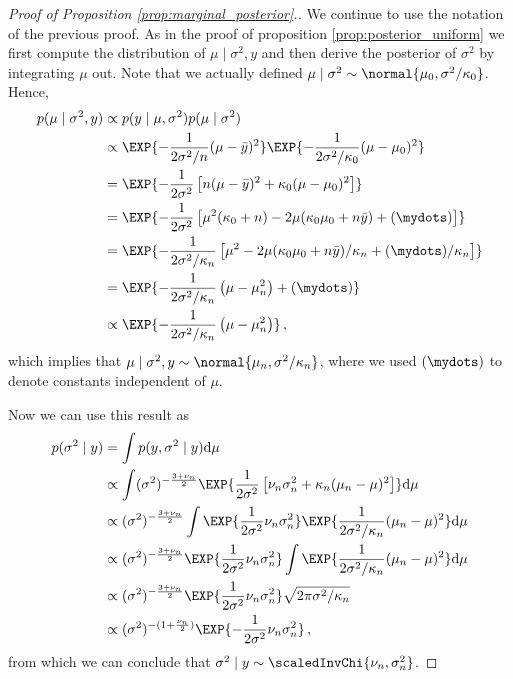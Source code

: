 \begin{proof}[Proof of Proposition \ref{prop:marginal_posterior}.]
We continue to use the notation of the previous proof.
As in the proof of proposition \ref{prop:posterior_uniform} we first compute the distribution of $\mu \mid \sigma^2, y$ and then derive the posterior of $\sigma^2$ by integrating $\mu$ out.
Note that we actually defined $\mu \mid \sigma^2 \sim \normal{\mu_0, \sigma^2/\kappa_0}$.
Hence,
\begin{align*}
  p(\mu \mid \sigma^2, y) &\propto p(y \mid \mu, \sigma^2) p(\mu \mid \sigma^2)\\
  &\propto \EXP{-\frac{1}{2\sigma^2/n} (\mu - \bar{y})^2} \EXP{-\frac{1}{2\sigma^2/\kappa_0}(\mu - \mu_0)^2}\\
  &= \EXP{-\frac{1}{2\sigma^2}\left[n(\mu - \bar{y})^2 + \kappa_0(\mu - \mu_0)^2 \right]}\\
  &= \EXP{-\frac{1}{2\sigma^2}\left[\mu^2(\kappa_0 + n) - 2\mu(\kappa_0\mu_0 + n\bar{y}) + (\mydots) \right]}\\
  &= \EXP{-\frac{1}{2\sigma^2 / \kappa_n}\left[\mu^2 - 2\mu(\kappa_0\mu_0 + n\bar{y})/\kappa_n + (\mydots)/\kappa_n \right]}\\
  &= \EXP{-\frac{1}{2\sigma^2 / \kappa_n}\left(\mu - \mu_n^2\right) + (\mydots)}\\
  &\propto \EXP{-\frac{1}{2\sigma^2 / \kappa_n}\left(\mu - \mu_n^2\right)} \,,
\end{align*}
which implies that $\mu \mid \sigma^2, y \sim \normal{\mu_n, \sigma^2 / \kappa_n}$, where we used $(\mydots)$ to denote constants independent of $\mu$.

Now we can use this result as
\begin{align*}
  p(\sigma^2 \mid y) &= \int p(y, \sigma^2 \mid y) \mathrm{d}\mu\\
  &\propto \int (\sigma^2)^{-\frac{3 + \nu_n}{2}} \EXP{\frac{1}{2\sigma^2} \left[\nu_n \sigma_n^2 + \kappa_n(\mu_n - \mu)^2 \right]}\mathrm{d}\mu\\
  &\propto (\sigma^2)^{-\frac{3 + \nu_n}{2}} \int \EXP{\frac{1}{2\sigma^2} \nu_n \sigma_n^2}\EXP{\frac{1}{2\sigma^2 / \kappa_n} (\mu_n - \mu)^2 }\mathrm{d}\mu\\
  &\propto (\sigma^2)^{-\frac{3 + \nu_n}{2}}\EXP{\frac{1}{2\sigma^2} \nu_n \sigma_n^2} \int \EXP{\frac{1}{2\sigma^2 / \kappa_n} (\mu_n - \mu)^2 }\mathrm{d}\mu\\
  &\propto (\sigma^2)^{-\frac{3 + \nu_n}{2}}\EXP{\frac{1}{2\sigma^2} \nu_n \sigma_n^2} \sqrt{2 \pi \sigma^2 / \kappa_n}\\
  &\propto (\sigma^2)^{-(1 + \frac{\nu_n}{2})} \EXP{-\frac{1}{2\sigma^2}\nu_n\sigma_n^2}\,,
\end{align*}
from which we can conclude that $\sigma^2 \mid y \sim \scaledInvChi{\nu_n, \sigma_n^2}$.


\end{proof}
